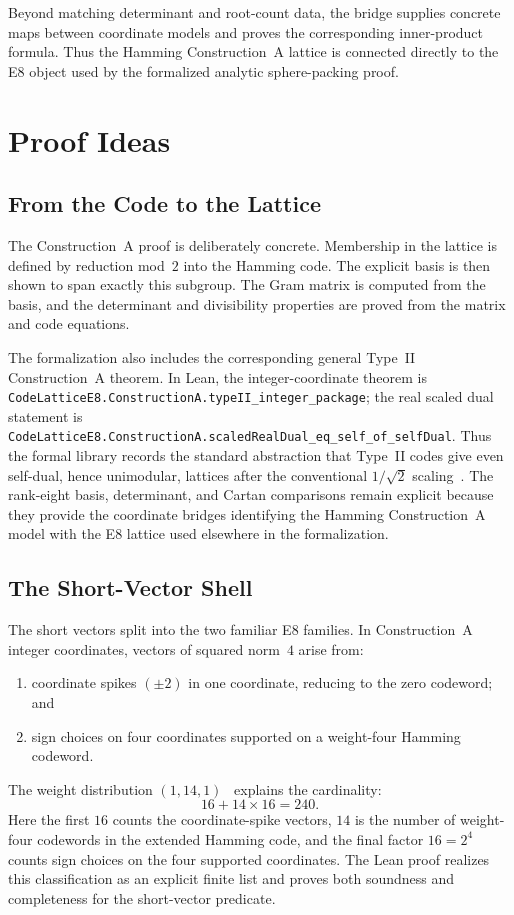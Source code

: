 \documentclass[12pt]{article}
\theoremstyle{definition}
\newcommand{\lean}[1]{\texttt{#1}}
\begin{document}
Beyond matching determinant and root-count data, the bridge supplies concrete
maps between coordinate models and proves the corresponding inner-product
formula.  Thus the Hamming Construction~A lattice is connected directly to the
E8 object used by the formalized analytic sphere-packing proof.

\section{Proof Ideas}
\label{sec:proofs}

\subsection{From the Code to the Lattice}

The Construction~A proof is deliberately concrete.  Membership in the lattice
is defined by reduction mod~$2$ into the Hamming code.  The explicit basis is
then shown to span exactly this subgroup.  The Gram matrix is computed from the
basis, and the determinant and divisibility properties are proved from the
matrix and code equations.

The formalization also includes the corresponding general Type~II
Construction~A theorem.  In Lean, the integer-coordinate theorem is
\lean{CodeLatticeE8.ConstructionA.typeII\_integer\_package}; the real scaled
dual statement is
\lean{CodeLatticeE8.ConstructionA.scaledRealDual\_eq\_self\_of\_selfDual}.
Thus the formal library records the standard abstraction that Type~II codes
give even self-dual, hence unimodular, lattices after the conventional
$1/\sqrt{2}$ scaling~\cite{MacSloane1977,ConwaySloane1999}.  The rank-eight
basis, determinant, and Cartan comparisons remain explicit because they provide
the coordinate bridges identifying the Hamming Construction~A model with the E8
lattice used elsewhere in the formalization.

\subsection{The Short-Vector Shell}

The short vectors split into the two familiar E8 families.  In Construction~A
integer coordinates, vectors of squared norm~$4$ arise from:
\begin{enumerate}
\item coordinate spikes $(\pm 2)$ in one coordinate, reducing to the zero
      codeword; and
\item sign choices on four coordinates supported on a weight-four Hamming
      codeword.
\end{enumerate}
The weight distribution $(1,14,1)$~\cite{MacSloane1977} explains the cardinality:
\[
  16 + 14 \times 16 = 240.
\]
Here the first \(16\) counts the coordinate-spike vectors, \(14\) is the number
of weight-four codewords in the extended Hamming code, and the final factor
\(16=2^4\) counts sign choices on the four supported coordinates.
The Lean proof realizes this classification as an explicit finite list and
proves both soundness and completeness for the short-vector predicate.
\end{document}
